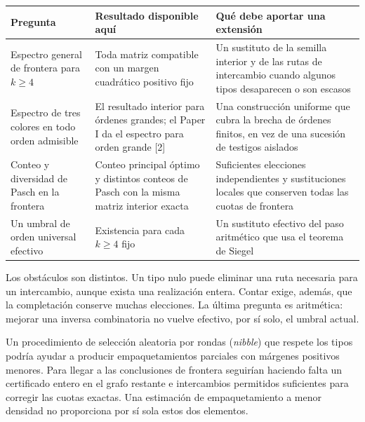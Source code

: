 \documentclass[spanish,11pt,a4paper]{article}
\begin{document}
{\begin{longtable}[]{@{}
  >{\raggedright\arraybackslash}p{}
  >{\raggedright\arraybackslash}p{}
  >{\raggedright\arraybackslash}p{}@{}}
\toprule\noalign{}
\begin{minipage}[b]{\linewidth}\raggedright
Pregunta
\end{minipage} & \begin{minipage}[b]{\linewidth}\raggedright
Resultado disponible aquí
\end{minipage} & \begin{minipage}[b]{\linewidth}\raggedright
Qué debe aportar una extensión
\end{minipage} \\
\midrule\noalign{}
\endhead
\bottomrule\noalign{}
\endlastfoot
Espectro general de frontera para \(k\ge4\) & Toda matriz compatible con un margen cuadrático positivo fijo & Un sustituto de la semilla interior y de las rutas de intercambio cuando algunos tipos desaparecen o son escasos \\
Espectro de tres colores en todo orden admisible & El resultado interior para órdenes grandes; el Paper I da el espectro para orden grande {[}2{]} & Una construcción uniforme que cubra la brecha de órdenes finitos, en vez de una sucesión de testigos aislados \\
Conteo y diversidad de Pasch en la frontera & Conteo principal óptimo y distintos conteos de Pasch con la misma matriz interior exacta & Suficientes elecciones independientes y sustituciones locales que conserven todas las cuotas de frontera \\
Un umbral de orden universal efectivo & Existencia para cada \(k\ge4\) fijo & Un sustituto efectivo del paso aritmético que usa el teorema de Siegel \\
\end{longtable}
}

Los obstáculos son distintos. Un tipo nulo puede eliminar una ruta necesaria para un intercambio, aunque exista una realización entera. Contar exige, además, que la completación conserve muchas elecciones. La última pregunta es aritmética: mejorar una inversa combinatoria no vuelve efectivo, por sí solo, el umbral actual.

Un procedimiento de selección aleatoria por rondas (\emph{nibble}) que respete los tipos podría ayudar a producir empaquetamientos parciales con márgenes positivos menores. Para llegar a las conclusiones de frontera seguirían haciendo falta un certificado entero en el grafo restante e intercambios permitidos suficientes para corregir las cuotas exactas. Una estimación de empaquetamiento a menor densidad no proporciona por sí sola estos dos elementos.
\end{document}
